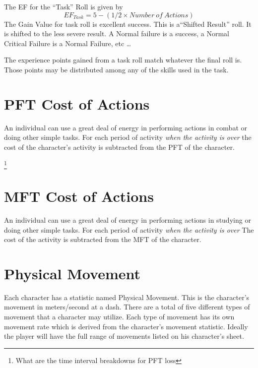 The EF for the ``Task'' Roll is given by \[ EF_{Task} = 5 - ( 1/2
\times {Number\ of\ Actions }) \]  The Gain Value for task roll is
excellent success. This is a``Shifted Result'' roll. It is shifted to
the less severe result. A Normal failure is a success, a Normal
Critical Failure is a Normal Failure, etc \dots

The experience points gained from a task roll match whatever the
final roll is. Those points may be distributed among any of the skills used
in the task.

\section{PFT Cost of Actions}

An individual can use a great deal of energy in performing actions in
combat or doing other simple tasks. For each period of activity {\em
when the activity is over} the cost of the character's activity is
subtracted from the PFT of the character.

\footnote{What are the time interval breakdowns for PFT loss} 



\section{MFT Cost of Actions}

An individual can use a great deal of energy in performing actions in studying or
doing other simple tasks. For each period of activity {\em when the 
activity is over} The cost of the activity is subtracted from the 
MFT of the character.



\section{Physical Movement}

Each character has a statistic named Physical Movement. This is the character's
movement in meters/second at a dash. There are a total of five different types
of movement that a character may utilize. Each type of movement has its own
movement rate which is derived from the character's movement statistic. 
Ideally the player will have the full range of movements listed on his 
character's sheet. 



